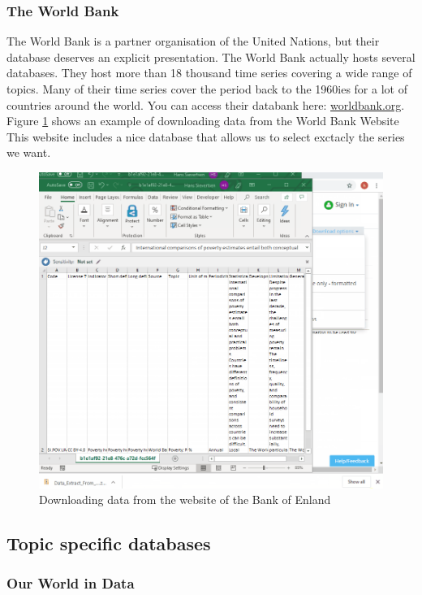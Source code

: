 \documentclass[]{book}
\begin{document}
\hypertarget{the-world-bank}{%
\subsubsection{The World Bank}\label{the-world-bank}}

The World Bank is a partner organisation of the United Nations, but their database deserves an explicit presentation. The World Bank actually hosts several databases. They host more than 18 thousand time series covering a wide range of topics. Many of their time series cover the period back to the 1960ies for a lot of countries around the world. You can access their databank here: \href{http://worldbank.org}{worldbank.org}. Figure \ref{fig:source7} shows an example of downloading data from the World Bank Website This website includes a nice database that allows us to select exctacly the series we want.

\begin{figure}

{\centering \includegraphics[width=0.6\linewidth]{_resources/chapter_sources/wb} 

}

\caption{Downloading data from the website of the Bank of Enland}\label{fig:source7}
\end{figure}

\hypertarget{topic-specific-databases}{%
\subsection{Topic specific databases}\label{topic-specific-databases}}

\hypertarget{our-world-in-data}{%
\subsubsection{Our World in Data}\label{our-world-in-data}}
\end{document}
